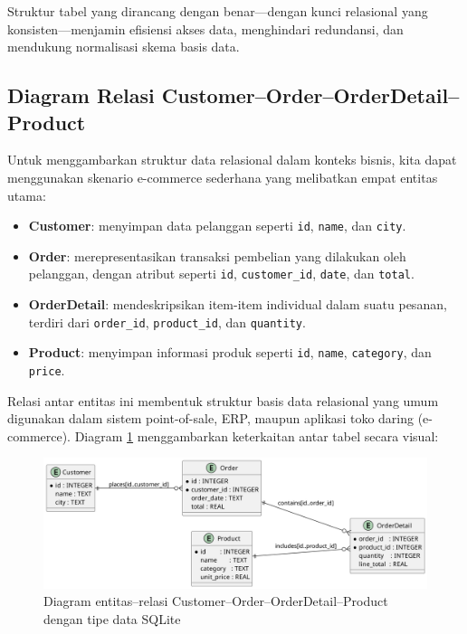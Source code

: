 Struktur tabel yang dirancang dengan benar—dengan kunci relasional yang konsisten—menjamin efisiensi akses data, menghindari redundansi, dan mendukung normalisasi skema basis data.

\subsection{Diagram Relasi Customer--Order--OrderDetail--Product}

Untuk menggambarkan struktur data relasional dalam konteks bisnis, kita dapat menggunakan skenario e-commerce sederhana yang melibatkan empat entitas utama:

\begin{itemize}
	\item \textbf{Customer}: menyimpan data pelanggan seperti \texttt{id}, \texttt{name}, dan \texttt{city}.
	\item \textbf{Order}: merepresentasikan transaksi pembelian yang dilakukan oleh pelanggan, dengan atribut seperti \texttt{id}, \texttt{customer\_id}, \texttt{date}, dan \texttt{total}.
	\item \textbf{OrderDetail}: mendeskripsikan item-item individual dalam suatu pesanan, terdiri dari \texttt{order\_id}, \texttt{product\_id}, dan \texttt{quantity}.
	\item \textbf{Product}: menyimpan informasi produk seperti \texttt{id}, \texttt{name}, \texttt{category}, dan \texttt{price}.
\end{itemize}

Relasi antar entitas ini membentuk struktur basis data relasional yang umum digunakan dalam sistem point-of-sale, ERP, maupun aplikasi toko daring (e-commerce). Diagram \ref{fig:customer_order_erd} menggambarkan keterkaitan antar tabel secara visual:

\begin{figure}[h]
	\centering
	\includegraphics[width=\textwidth]{../slides/session04/data/out/erd.png}
	\caption{Diagram entitas–relasi Customer–Order–OrderDetail–Product dengan tipe data SQLite}
	\label{fig:customer_order_erd}
\end{figure}

